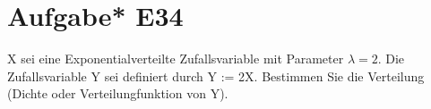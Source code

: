 \section{Aufgabe* E34}
X sei eine Exponentialverteilte Zufallsvariable mit Parameter $\lambda=2$. Die Zufallsvariable Y sei definiert durch
Y := 2X. Bestimmen Sie die Verteilung (Dichte oder Verteilungfunktion von Y).